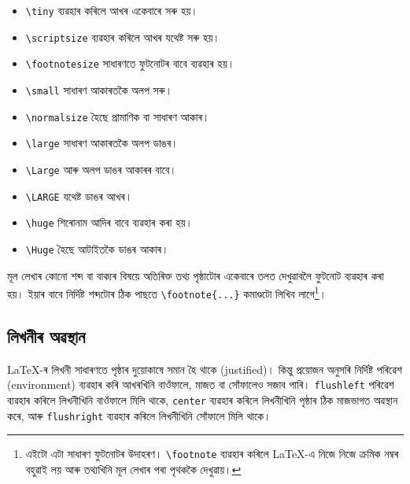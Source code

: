 \documentclass[12pt,a4paper]{article} %
\begin{document}
	\begin{itemize}[noitemsep]
		\item {\tiny \texttt{\textbackslash tiny} ব্যৱহাৰ কৰিলে আখৰ একেবাৰে সৰু হয়।}
		\item {\scriptsize \texttt{\textbackslash scriptsize} ব্যৱহাৰ কৰিলে আখৰ যথেষ্ট সৰু হয়।}
		\item {\footnotesize \texttt{\textbackslash footnotesize} সাধাৰণতে ফুটনোটৰ বাবে ব্যৱহাৰ হয়।}
		\item {\small \texttt{\textbackslash small} সাধাৰণ আকাৰতকৈ অলপ সৰু।}
		\item {\normalsize \texttt{\textbackslash normalsize} হৈছে প্ৰামাণিক বা সাধাৰণ আকাৰ।}
		\item {\large \texttt{\textbackslash large} সাধাৰণ আকাৰতকৈ অলপ ডাঙৰ।}
		\item {\Large \texttt{\textbackslash Large} আৰু অলপ ডাঙৰ আকাৰৰ বাবে।}
		\item {\LARGE \texttt{\textbackslash LARGE} যথেষ্ট ডাঙৰ আখৰ।}
		\item {\huge \texttt{\textbackslash huge} শিৰোনাম আদিৰ বাবে ব্যৱহাৰ কৰা হয়।}
		\item {\Huge \texttt{\textbackslash Huge} হৈছে আটাইতকৈ ডাঙৰ আকাৰ।}
	\end{itemize}
	
	মূল লেখাৰ কোনো শব্দ বা বাক্যৰ বিষয়ে অতিৰিক্ত তথ্য পৃষ্ঠাটোৰ একেবাৰে তলত দেখুৱাবলৈ ফুটনোট ব্যৱহাৰ কৰা হয়। ইয়াৰ বাবে নিৰ্দিষ্ট শব্দটোৰ ঠিক পাছতে \texttt{\textbackslash footnote\{...\}} কমাণ্ডটো লিখিব লাগে\footnote{এইটো এটা সাধাৰণ ফুটনোটৰ উদাহৰণ। \texttt{\textbackslash footnote} ব্যৱহাৰ কৰিলে \LaTeX{}-এ নিজে নিজে ক্ৰমিক নম্বৰ বহুৱাই লয় আৰু তথ্যখিনি মূল লেখাৰ পৰা পৃথককৈ দেখুৱায়।}।
	
	\subsection{লিখনীৰ অৱস্থান}
	
	\LaTeX{}-ৰ লিখনী সাধাৰণতে পৃষ্ঠাৰ দুয়োকাষে সমান হৈ থাকে (justified)। কিন্তু প্ৰয়োজন অনুসৰি নিৰ্দিষ্ট পৰিৱেশ (environment) ব্যৱহাৰ কৰি আখৰখিনি বাওঁফালে, মাজত বা সোঁফালেও সজাব পাৰি। \texttt{flushleft} পৰিৱেশ ব্যৱহাৰ কৰিলে লিখনীখিনি বাওঁফালে মিলি থাকে, \texttt{center} ব্যৱহাৰ কৰিলে লিখনীখিনি পৃষ্ঠাৰ ঠিক মাজভাগত অৱস্থান কৰে, আৰু \texttt{flushright} ব্যৱহাৰ কৰিলে লিখনীখিনি সোঁফালে মিলি থাকে।
	
\end{document}
